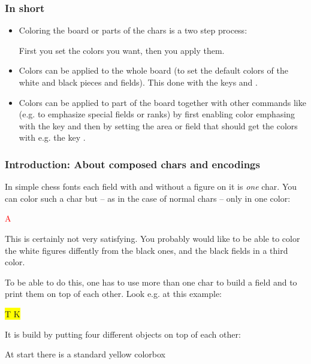 \documentclass[pagesize,parskip=half-,fontsize=12pt]{scrartcl}
\newcommand\Chess[1][1cm]{\boardfont\fontsize{#1}{#1}\setboardfontsize{#1}\selectfont}
\begin{document}
\subsubsection{In short}

\begin{itemize}

\item Coloring the board or parts of the chars is a two step process:

First you set the colors you want, then you apply them.

\item
Colors can be applied to the whole board (to set the default colors
of the white and black pieces and fields). This done with the keys
 and .

\item Colors can be applied to part of the board together with other commands like 
 (e.g. to emphasize special fields or ranks)
by first enabling color emphasing with the key  and
then by setting the area or field that should get the colors with
e.g. the key .


\end{itemize}



\subsubsection{Introduction: About composed chars and encodings}
In simple chess fonts each field with and without a figure on it is
\emph{one} char. You can color such a char but -- as in the case of normal chars -- only
in one color:

\textcolor{red}{\Large A \BlackKingOnBlack}

This is certainly not very satisfying. You probably would like to be
able to color the white figures diffently from the black ones, and
the black fields in a third color.

To be able to do this, one has to use more than one char to build a
field and to print them on top of each other. Look e.g. at this
example:

 \colorbox{yellow}{\Chess
 \makebox[0pt][l]{\color{blue}\BlackEmptySquare}%
 \color{green}T%
 \color{red}K}

It is build by putting four different objects on top of each other:

At start there is a standard yellow colorbox
\end{document}
